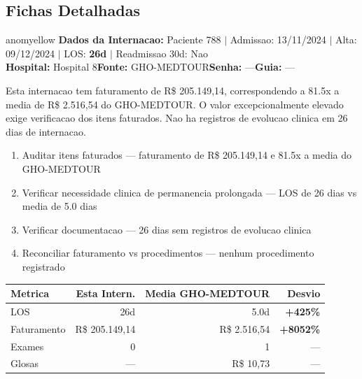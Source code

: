\documentclass[a4paper,10pt]{article}
\begin{document}
\subsection{Fichas Detalhadas}
\begin{anomalycard}[Internacao 750 | GHO-MEDTOUR | MODERADO (z=2.79)]{anomyellow}
\textbf{Dados da Internacao:} Paciente 788 $\mid$ Admissao: 13/11/2024 $\mid$ Alta: 09/12/2024 $\mid$ LOS: \textbf{26d} $\mid$ Readmissao 30d: Nao\\
\textbf{Hospital:} Hospital 8\quad\textbf{Fonte:} GHO-MEDTOUR\quad\textbf{Senha:} ---\quad\textbf{Guia:} ---\\
\vspace{2pt}\begin{tcolorbox}[colback=severityred!20,colframe=anomyellow,title={\textbf{Interpretacao de Negocio}},fonttitle=\bfseries\small,left=4pt,right=4pt,top=3pt,bottom=3pt]
{\small Esta internacao tem faturamento de R\$ 205.149,14, correspondendo a 81.5x a media de R\$ 2.516,54 do GHO-MEDTOUR. O valor excepcionalmente elevado exige verificacao dos itens faturados. Nao ha registros de evolucao clinica em 26 dias de internacao.}
\end{tcolorbox}
\begin{tcolorbox}[colback=severityyellow!30,colframe=anomorange,title={\textbf{Recomendacoes Especificas}},fonttitle=\bfseries\small,left=4pt,right=4pt,top=3pt,bottom=3pt]
\begin{enumerate}[nosep,leftmargin=16pt]
\item {\small Auditar itens faturados --- faturamento de R\$ 205.149,14 e 81.5x a media do GHO-MEDTOUR}
\item {\small Verificar necessidade clinica de permanencia prolongada --- LOS de 26 dias vs media de 5.0 dias}
\item {\small Verificar documentacao --- 26 dias sem registros de evolucao clinica}
\item {\small Reconciliar faturamento vs procedimentos --- nenhum procedimento registrado}
\end{enumerate}
\end{tcolorbox}
\begin{center}\begin{tabular}{l r r r}\toprule\textbf{Metrica} & \textbf{Esta Intern.} & \textbf{Media GHO-MEDTOUR} & \textbf{Desvio} \\\midrule
LOS & 26d & 5.0d & \textcolor{anomred}{\textbf{+425\%}} \\
Faturamento & R\$ 205.149,14 & R\$ 2.516,54 & \textcolor{anomred}{\textbf{+8052\%}} \\
Exames & 0 & 1 & --- \\
Glosas & --- & R\$ 10,73 & --- \\
\bottomrule\end{tabular}\end{center}


\end{anomalycard}
\end{document}
